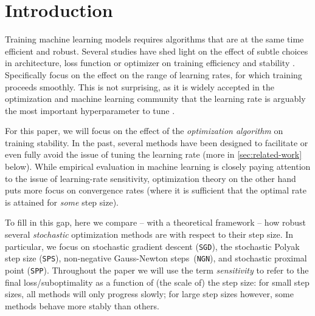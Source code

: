 \documentclass{article}
\newcommand{\SGD}{{\texttt{SGD}}}
\newcommand{\SPP}{{\texttt{SPP}}}
\newcommand{\SPS}{{\texttt{SPS}}}
\newcommand{\NGN}{{\texttt{NGN}}}
\theoremstyle{plain}
\theoremstyle{definition}
\theoremstyle{remark}
\begin{document}
\begin{abstract}
  We present a theoretical analysis of stochastic optimization methods in terms of their sensitivity with respect to the step size.
    We identify a key quantity that, for each method, describes how the performance degrades as the step size becomes too large.
    For convex problems, we show that this quantity directly impacts the suboptimality bound of the method.
    Most importantly, our analysis provides direct \emph{theoretical} evidence that adaptive step-size methods, such as \SPS{} or \NGN{}, are more robust than \SGD{}.
    This allows us to quantify the advantage of these adaptive methods beyond empirical evaluation.
    Finally, we show through experiments that our theoretical bound qualitatively mirrors the actual performance as a function of the step size, even for non-convex problems.
\end{abstract}

\section{Introduction}
%
Training machine learning models requires algorithms that are at the same time efficient and robust. Several studies have shed light on the effect of subtle choices in architecture, loss function or optimizer on training efficiency and stability \citep{Wortsman2024,Everett2024,Olmo2025}. Specifically \citet{Wortsman2024} focus on the effect on the range of learning rates, for which training proceeds smoothly. This is not surprising, as it is widely accepted in the optimization and machine learning community that the learning rate is arguably the most important hyperparameter to tune \citep{Bengio2012}.

For this paper, we will focus on the effect of the \emph{optimization algorithm} on training stability. In the past, several methods have been designed to facilitate or even fully avoid the issue of tuning the learning rate (more in \cref{sec:related-work} below). While empirical evaluation in machine learning is closely paying attention to the issue of learning-rate sensitivity, optimization theory on the other hand puts more focus on convergence rates (where it is sufficient that the optimal rate is attained for \emph{some} step size).

To fill in this gap, here we compare -- with a theoretical framework -- how robust several \emph{stochastic} optimization methods are with respect to their step size. In particular, we focus on stochastic gradient descent (\SGD{}), the stochastic Polyak step size (\SPS{}), non-negative Gauss-Newton steps~(\NGN{}), and stochastic proximal point (\SPP{}). Throughout the paper we will use the term \emph{sensitivity} to refer to the final loss/suboptimality as a function of (the scale of) the step size: for small step sizes, all methods will only progress slowly; for large step sizes however, some methods behave more stably than others.
\end{document}
